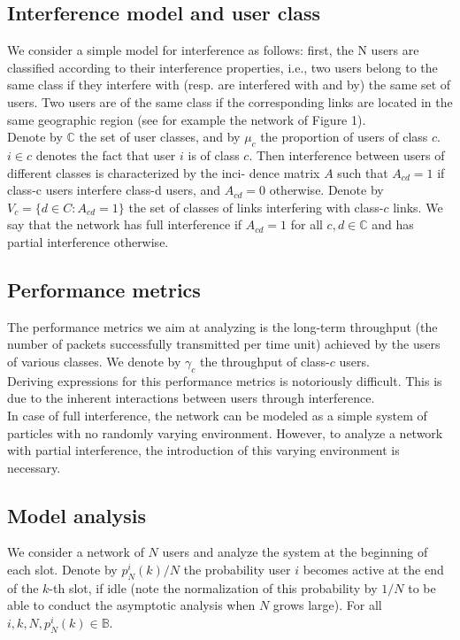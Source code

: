 \documentclass[letterpaper,english,10pt]{article}
\begin{document}
\subsection{Interference model and user class} We consider a simple model for interference as follows: first, the N users
are classified according to their interference properties, i.e., two users belong to the same class if they interfere with (resp. are interfered with and by) the same set of users. Two users are of the same class if the corresponding links are located in the same geographic region (see for example the network of Figure 1). \\

Denote by $\mathbb{C}$ the set of user classes, and by $\mu_c$ the proportion of users of class $c$. $i \in c$ denotes the fact that user $i$ is of class $c$. Then interference between users of different classes is characterized by the inci-
dence matrix $A$ such that $A_{cd} = 1$ if class-c users interfere class-d users, and $A_{cd} = 0$ otherwise. 
Denote by $V_c = \{d \in C : A_{cd} = 1\}$ the set of classes of links interfering with class-$c$ links.
We say that the network has full interference if $A_{cd} = 1$ for all $c, d \in \mathbb{C}$ and has partial interference otherwise.

\subsection{Performance metrics}The performance metrics we aim at analyzing is the long-term throughput (the number of packets successfully transmitted per time unit) achieved by the users of various classes. We denote by $\gamma_c$ the throughput of class-$c$ users.\\

Deriving expressions for this performance metrics is notoriously difficult. This is due to the inherent interactions between users through interference.\\

In case of full interference, the network can be modeled as a simple system of particles with no randomly varying environment. However, to analyze a network with partial interference, the introduction of this varying environment is necessary.\\

\subsection{Model analysis}We consider a network of $N$ users and analyze the system at the beginning of each slot. Denote by $p_N
^i (k)/N$ the probability user $i$ becomes active at the end of the $k$-th slot, if idle (note the normalization of this probability by $1/N$ to be able to conduct the asymptotic analysis when $N$ grows large). For all $i, k, N , p_N^i (k) \in \mathbb{B}$.\\
\end{document}
